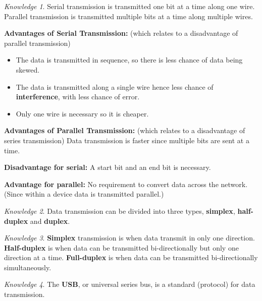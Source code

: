 \documentclass[8pt]{article}
\theoremstyle{remark}
\newtheorem{knowledge}{Knowledge}[subsection]
\begin{document}
        \begin{knowledge}
            Serial transmission is transmitted one bit at a time along one wire. Parallel transmission is transmitted multiple bits at a time along multiple wires.

            \textbf{Advantages of Serial Transmission:} (which relates to a disadvantage of parallel transmission)
            \begin{itemize}
                \item The data is transmitted in sequence, so there is less chance of data being skewed.
                \item The data is transmitted along a single wire hence less chance of \textbf{interference}, with less chance of error.
                \item Only one wire is necessary so it is cheaper.
            \end{itemize}

            \textbf{Advantages of Parallel Transmission:} (which relates to a disadvantage of series transmission) Data transmission is faster since multiple bits are sent at a time.

            \textbf{Disadvantage for serial:} A start bit and an end bit is necessary.

            \textbf{Advantage for parallel:} No requirement to convert data across the network. (Since within a device data is transmitted parallel.)
        \end{knowledge}

        \begin{knowledge}
            Data transmission can be divided into three types, \textbf{simplex}, \textbf{half-duplex} and \textbf{duplex}.
        \end{knowledge}

        \begin{knowledge}
            \textbf{Simplex} transmission is when data transmit in only one direction. \textbf{Half-duplex} is when data can be transmitted bi-directionally but only one direction at a time. \textbf{Full-duplex} is when data can be transmitted bi-directionally simultaneously.
        \end{knowledge}

        \begin{knowledge}
            The \textbf{USB}, or universal series bus, is a standard (protocol) for data transmission.
        \end{knowledge}
\end{document}

